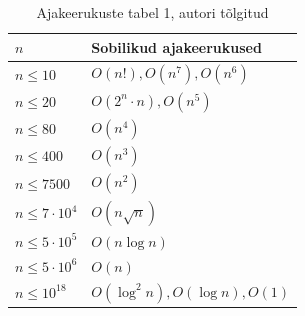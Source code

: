 \documentclass{trkut}
\begin{document}
\begin{table}[H]%
   \caption{Ajakeerukuste tabel 1, autori tõlgitud}%
    \begin{tabular}{|l|l|}
\hline
$n$                & Sobilikud ajakeerukused        \\ \hline
$n\le 10$          & $O(n!), O(n^7), O(n^6)$        \\ \hline
$n\le 20$          & $O(2^n\cdot n), O(n^5)$        \\ \hline
$n\le 80$          & $O(n^4)$                       \\ \hline
$n\le 400$         & $O(n^3)$                       \\ \hline
$n\le 7500$        & $O(n^2)$                       \\ \hline
$n\le 7\cdot 10^4$ & $O(n\sqrt{n})$                 \\ \hline
$n\le 5\cdot 10^5$ & $O(n\log n)$                   \\ \hline
$n\le 5\cdot 10^6$ & $O(n)$                         \\ \hline
$n\le 10^18$       & $O(\log ^2n), O(\log n), O(1)$ \\ \hline
\end{tabular}
    \label{timecomplexity}%
\end{table}
\end{document}
